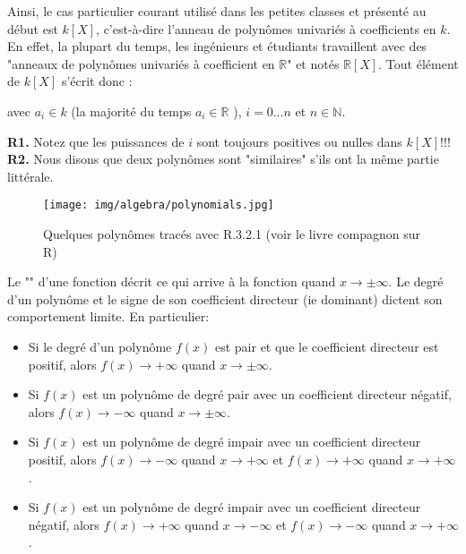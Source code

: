 	Ainsi, le cas particulier courant utilisé dans les petites classes et présenté au début est $k[X]$, c'est-à-dire l'anneau de polynômes univariés à coefficients en $k$. En effet, la plupart du temps, les ingénieurs et étudiants travaillent avec des "anneaux de polynômes univariés à coefficient en $\mathbb{R}$" et notés $\mathbb{R}[X]$. Tout élément de $k[X]$ s'écrit donc :
	
	avec $a_i\in k$ (la majorité du temps $a_i\in \mathbb{R}$ ), $i=0...n$ et $n\in \mathbb{N}$.
	\begin{tcolorbox}[title=Remarques,colframe=black,arc=10pt]
	\textbf{R1.} Notez que les puissances de $i$ sont toujours positives ou nulles dans $k[X]$!!!\\
	
	\textbf{R2.} Nous disons que deux polynômes sont "similaires" s'ils ont la même partie littérale.
	\end{tcolorbox}
	\begin{figure}[H]
		\centering
		\texttt{[image: img/algebra/polynomials.jpg]}
		\caption[Quelques polynômes tracés avec R.3.2.1]{Quelques polynômes tracés avec R.3.2.1 (voir le livre compagnon sur R)}
	\end{figure}
	Le "" d'une fonction décrit ce qui arrive à la fonction quand $x\rightarrow \pm\infty$. Le degré d'un polynôme et le signe de son coefficient directeur (ie dominant) dictent son comportement limite. En particulier:
	\begin{itemize}
		\item Si le degré d'un polynôme $f(x)$ est pair et que le coefficient directeur est positif, alors $f(x)\rightarrow +\infty$ quand $x\rightarrow \pm\infty$.
		
		\item Si $f(x)$ est un polynôme de degré pair avec un coefficient directeur négatif, alors $f(x)\rightarrow -\infty$ quand $x\rightarrow \pm\infty$.
		
		\item Si $f(x)$ est un polynôme de degré impair avec un coefficient directeur positif, alors $f(x)\rightarrow -\infty$ quand $x\rightarrow +\infty$ et $f(x)\rightarrow +\infty$ quand $x\rightarrow +\infty$.
 
		\item Si $f(x)$ est un polynôme de degré impair avec un coefficient directeur négatif, alors $f(x)\rightarrow +\infty$ quand $x\rightarrow -\infty$ et $f(x)\rightarrow -\infty$ quand $x\rightarrow +\infty$.
	\end{itemize}
